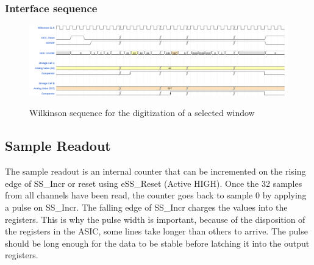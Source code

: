 \subsubsection*{Interface sequence}
\begin{figure}[H]
\centering
\includegraphics[width=1\textwidth]{figures/wavedrom/wilkinsonseq.png}\\
\caption{\label{fig:wilkinsonseq} Wilkinson sequence for the digitization of a selected window}
\end{figure}

\subsection{Sample Readout}
The sample readout is an internal counter that can be incremented on the rising edge of SS\_Incr or reset using eSS\_Reset (Active HIGH). Once the 32 samples from all channels have been read, the counter goes back to sample 0 by applying a pulse on SS\_Incr. The falling edge of SS\_Incr charges the values into the registers. This is why the pulse width is important, because of the disposition of the registers in the ASIC, some lines take longer than others to arrive. The pulse should be long enough for the data to be stable before latching it into the output registers.

